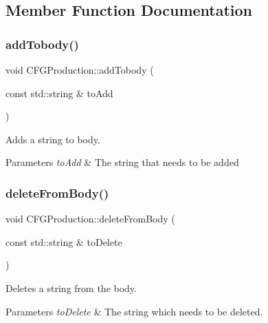 \subsection{Member Function Documentation}
\mbox{\label{classCFGProduction_a5e4960e3b31387a1ffda43af338d9d62}} 
\subsubsection{\texorpdfstring{add\+Tobody()}{addTobody()}}
{\footnotesize\ttfamily void C\+F\+G\+Production\+::add\+Tobody (\begin{DoxyParamCaption}\item[{const std\+::string \&}]{to\+Add }\end{DoxyParamCaption})}



Adds a string to body. 


\begin{DoxyParams}{Parameters}
{\em to\+Add} & The string that needs to be added \\
\hline
\end{DoxyParams}
\mbox{\label{classCFGProduction_a41772dfd4bf4811a91cf6730a0218eb3}} 
\subsubsection{\texorpdfstring{delete\+From\+Body()}{deleteFromBody()}\hspace{0.1cm}{\footnotesize\ttfamily [1/2]}}
{\footnotesize\ttfamily void C\+F\+G\+Production\+::delete\+From\+Body (\begin{DoxyParamCaption}\item[{const std\+::string \&}]{to\+Delete }\end{DoxyParamCaption})}



Deletes a string from the body. 


\begin{DoxyParams}{Parameters}
{\em to\+Delete} & The string which needs to be deleted. \\
\hline
\end{DoxyParams}
\mbox{\label{classCFGProduction_a8f6f3da60808ca63e8c847a9d7b63261}} 
